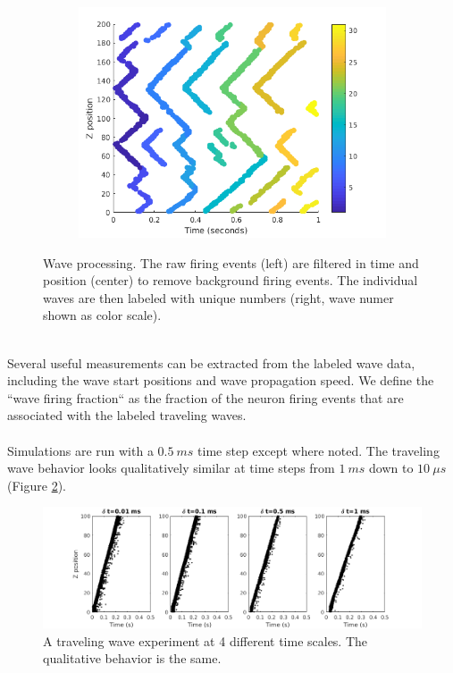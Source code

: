 \documentclass[a4paper,11pt]{article}
\begin{document}
\begin{figure}[!htb]
\begin{subfigure}{0.33\textwidth}
 \end{subfigure}%
 \begin{subfigure}{0.33\textwidth}
  \centering
  \includegraphics[width=\textwidth]{fig/2x2_wave_IDs}
 \end{subfigure}%
 \caption{Wave processing. The raw firing events (left) are filtered in time and position (center) to remove background firing events. The individual waves are then labeled with unique numbers (right, wave numer shown as color scale).}
 \label{fig:wave_analysis}
\end{figure}
\\
Several useful measurements can be extracted from the labeled wave data, including the wave start positions and wave propagation speed.
We define the ``wave firing fraction`` as the fraction of the neuron firing events that are associated with the labeled traveling waves.
\\ \\
Simulations are run with a $0.5~ms$ time step except where noted.
The traveling wave behavior looks qualitatively similar at time steps from $1~ms$ down to $10~\mu s$ (Figure \ref{fig:time_step}).
\begin{figure}[!htb]
 \centering
 \includegraphics[width=\textwidth]{fig/TimeStepEffect}
  \caption{A traveling wave experiment at 4 different time scales. The qualitative behavior is the same.}
 \label{fig:time_step}
\end{figure}
\end{document}

